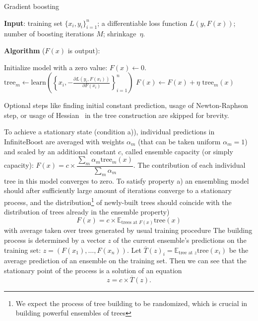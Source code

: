 \begin{algorithm}[!h]
  \caption{Gradient boosting}\label{alg:gb}
  {\bf Input}: training set $\{x_i, y_i\}_{i=1}^n$; a differentiable loss function $L(y, F(x))$; number of boosting iterations $M$; shrinkage~$\eta$.

  {\bf Algorithm} ($F(x)$ is output):
  \begin{algorithmic}
    \State Initialize model with a zero value: $F(x) \gets 0$.
      \State $\text{tree}_m \gets \text{learn}\left(\left\{x_i, -\frac{\partial L(y_i, F(x_i))}{\partial F(x_i)}\right\}_{i=1}^n\right)$
      \State $F(x) \gets F(x) + \eta \text{ tree}_m(x)$
    \EndFor
  \end{algorithmic}

  Optional steps like finding initial constant prediction, usage of Newton-Raphson step,
  or usage of Hessian~\cite{key-xgboost} in the tree construction are skipped for brevity.
\end{algorithm}

To achieve a stationary state (condition a)), individual predictions in InfiniteBoost are averaged with weights $\alpha_m$
(that can be taken uniform $\alpha_m = 1$)
and scaled by an additional constant $c$, called ensemble capacity (or simply capacity):
$ F(x) = c \times \dfrac{\sum_m \alpha_m \text{tree}_m(x)}{ \sum_m \alpha_m } $.
The contribution of each individual tree in this model converges to zero.
To satisfy property a) an ensembling model should after sufficiently large amount of iterations converge to a stationary process,
and the distribution\footnote{We expect the process of tree building to be randomized, which is crucial in building powerful ensembles of trees} of newly-built trees should coincide with the distribution of trees already in the ensemble property)
\begin{equation*}
  F(x) = c \times \mathbb{E}_{\text{trees at }F(x)} \text{tree}(x)
\end{equation*}
with average taken over trees generated by usual training procedure
The building process is determined by a vector $z$ of the current ensemble's predictions on the training set:
$ z = ( F(x_1), \dots, F(x_n) ) $.
Let $ \overline{T}(z)_i = \mathbb{E}_\text{tree at $z$} \text{tree}(x_i) $ be the average prediction of an ensemble on the training set. Then we can see that the stationary point of the process is a solution of an equation
\begin{equation}
    z = c \times \overline{T}(z) \label{eq:stationary}.
\end{equation}

